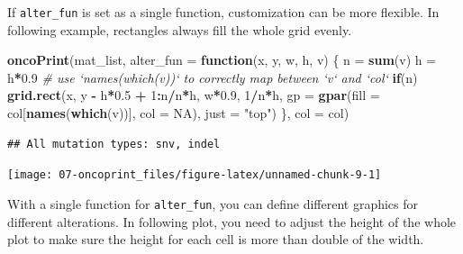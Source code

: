 \documentclass[]{book}
\newenvironment{Shaded}{\begin{snugshade}}{\end{snugshade}}
\newcommand{\KeywordTok}[1]{\textcolor[rgb]{0.13,0.29,0.53}{\textbf{#1}}}
\newcommand{\DataTypeTok}[1]{\textcolor[rgb]{0.13,0.29,0.53}{#1}}
\newcommand{\DecValTok}[1]{\textcolor[rgb]{0.00,0.00,0.81}{#1}}
\newcommand{\FloatTok}[1]{\textcolor[rgb]{0.00,0.00,0.81}{#1}}
\newcommand{\StringTok}[1]{\textcolor[rgb]{0.31,0.60,0.02}{#1}}
\newcommand{\CommentTok}[1]{\textcolor[rgb]{0.56,0.35,0.01}{\textit{#1}}}
\newcommand{\OtherTok}[1]{\textcolor[rgb]{0.56,0.35,0.01}{#1}}
\newcommand{\ControlFlowTok}[1]{\textcolor[rgb]{0.13,0.29,0.53}{\textbf{#1}}}
\newcommand{\OperatorTok}[1]{\textcolor[rgb]{0.81,0.36,0.00}{\textbf{#1}}}
\newcommand{\NormalTok}[1]{#1}
\theoremstyle{definition}
\theoremstyle{definition}
\theoremstyle{definition}
\theoremstyle{remark}
\begin{document}
If \texttt{alter\_fun} is set as a single function, customization can be
more flexible. In following example, rectangles always fill the whole
grid evenly.

\begin{Shaded}
\begin{Highlighting}[]
\KeywordTok{oncoPrint}\NormalTok{(mat_list,}
    \DataTypeTok{alter_fun =} \ControlFlowTok{function}\NormalTok{(x, y, w, h, v) \{}
\NormalTok{        n =}\StringTok{ }\KeywordTok{sum}\NormalTok{(v)}
\NormalTok{        h =}\StringTok{ }\NormalTok{h}\OperatorTok{*}\FloatTok{0.9}
        \CommentTok{# use `names(which(v))` to correctly map between `v` and `col`}
        \ControlFlowTok{if}\NormalTok{(n) }\KeywordTok{grid.rect}\NormalTok{(x, y }\OperatorTok{-}\StringTok{ }\NormalTok{h}\OperatorTok{*}\FloatTok{0.5} \OperatorTok{+}\StringTok{ }\DecValTok{1}\OperatorTok{:}\NormalTok{n}\OperatorTok{/}\NormalTok{n}\OperatorTok{*}\NormalTok{h, w}\OperatorTok{*}\FloatTok{0.9}\NormalTok{, }\DecValTok{1}\OperatorTok{/}\NormalTok{n}\OperatorTok{*}\NormalTok{h, }
            \DataTypeTok{gp =} \KeywordTok{gpar}\NormalTok{(}\DataTypeTok{fill =}\NormalTok{ col[}\KeywordTok{names}\NormalTok{(}\KeywordTok{which}\NormalTok{(v))], }\DataTypeTok{col =} \OtherTok{NA}\NormalTok{), }\DataTypeTok{just =} \StringTok{"top"}\NormalTok{)}
\NormalTok{    \}, }\DataTypeTok{col =}\NormalTok{ col)}
\end{Highlighting}
\end{Shaded}

\begin{verbatim}
## All mutation types: snv, indel
\end{verbatim}

\begin{center}\texttt{[image: 07-oncoprint\_files/figure-latex/unnamed-chunk-9-1]} \end{center}

With a single function for \texttt{alter\_fun}, you can define different
graphics for different alterations. In following plot, you need to
adjust the height of the whole plot to make sure the height for each
cell is more than double of the width.
\end{document}
